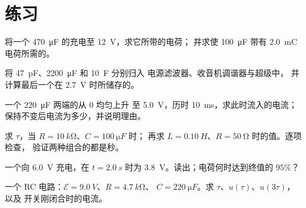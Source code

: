 \section{练习}

\begin{exercise}[$\star$]\label{exo:g12:rc-rl-circuits:1}
将一个 \qty{470}{\micro F} 的充电至 \qty{12}{V}，求它所带的电荷；
并求使 \qty{100}{\micro F} 带有 \qty{2.0}{mC} 电荷所需的。
\end{exercise}

\begin{exercise}[$\star$]\label{exo:g12:rc-rl-circuits:2}
将 \qty{47}{pF}、\qty{2200}{\micro F} 和 \qty{10}{F} 分别归入
电源滤波器、收音机调谐器与超级中，
并计算最后一个在 \qty{2.7}{V} 时所储存的。
\end{exercise}

\begin{exercise}[$\star$]\label{exo:g12:rc-rl-circuits:3}
一个 \qty{220}{\micro F} 两端的从 $0$ 均匀上升
至 \qty{5.0}{V}，历时 \qty{10}{ms}，求此时流入的电流；
保持不变后电流为多少，并说明理由。
\end{exercise}

\begin{exercise}[$\star$]\label{exo:g12:rc-rl-circuits:4}
求 $\tau$，当 $R = \qty{10}{k\ohm}$、$C = \qty{100}{\micro F}$ 时；
再求 $L = \qty{0.10}{H}$、$R = \qty{50}{\ohm}$ 时的值。逐项检查，
验证两种组合的都是秒。
\end{exercise}

\begin{exercise}[$\star$]\label{exo:g12:rc-rl-circuits:5}
一个向 \qty{6.0}{V} 充电，在
$t = \qty{2.0}{s}$ 时为 \qty{3.8}{V}。读出；电荷何时达到终值的 $95\%$？
\end{exercise}

\begin{exercise}[$\star\star$]\label{exo:g12:rc-rl-circuits:6}
一个 RC 电路：$\mathcal{E} = \qty{9.0}{V}$、$R = \qty{4.7}{k\ohm}$、
$C = \qty{220}{\micro F}$。求 $\tau$、$u(\tau)$、$u(3\tau)$，以及
开关刚闭合时的电流。
\end{exercise}

